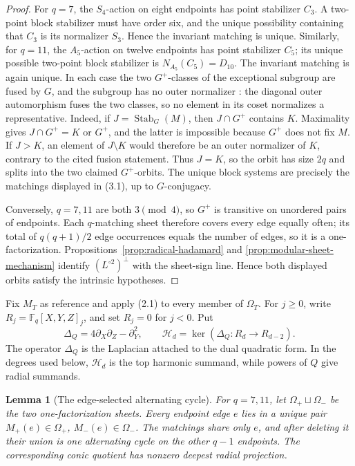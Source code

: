 \documentclass[11pt]{article}
\newtheorem{lemma}[theorem]{Lemma}
\theoremstyle{definition}
\theoremstyle{remark}
\newcommand{\F}{\mathbb{F}}
\begin{document}
\begin{proof}
For \(q=7\), the \(S_4\)-action on eight endpoints has point stabilizer
\(C_3\).  A two-point block stabilizer must have order six, and the
unique possibility containing that \(C_3\) is its normalizer \(S_3\).
Hence the invariant matching is unique.  Similarly, for \(q=11\), the
\(A_5\)-action on twelve endpoints has point stabilizer \(C_5\); its
unique possible two-point block stabilizer is
\(N_{A_5}(C_5)=D_{10}\).  The invariant matching is again unique.
In each case the two \(G^+\)-classes of the exceptional subgroup are
fused by \(G\), and the subgroup has no outer normalizer
\cite[Lemma~2.3]{Giudici2007}: the diagonal outer automorphism fuses the
two classes, so no element in its coset normalizes a representative.
Indeed, if \(J=\operatorname{Stab}_G(M)\), then
\(J\cap G^+\) contains \(K\).  Maximality gives
\(J\cap G^+=K\) or \(G^+\), and the latter is impossible because
\(G^+\) does not fix \(M\).  If \(J>K\), an element of \(J\setminus K\)
would therefore be an outer normalizer of \(K\), contrary to the cited
fusion statement.  Thus \(J=K\), so the orbit has size \(2q\) and
splits into the two claimed \(G^+\)-orbits.  The unique block systems
are precisely the matchings displayed in (3.1), up to
\(G\)-conjugacy.

Conversely, \(q=7,11\) are both \(3\pmod4\), so \(G^+\) is transitive on
unordered pairs of endpoints.  Each \(q\)-matching sheet therefore covers
every edge equally often; its total of \(q(q+1)/2\) edge occurrences
equals the number of edges, so it is a one-factorization.
Propositions~\ref{prop:radical-hadamard} and
\ref{prop:modular-sheet-mechanism} identify
\((L^{\circ2})^\perp\) with the sheet-sign line.  Hence both displayed
orbits satisfy the intrinsic hypotheses.
\end{proof}

Fix $M_T$ as reference and apply (2.1) to every member of $\Omega_T$.
For \(j\ge0\), write \(R_j=\F_q[X,Y,Z]_j\), and set \(R_j=0\) for
\(j<0\).  Put
\[
 \Delta_Q=4\partial_X\partial_Z-\partial_Y^2,\qquad
 \mathcal H_d=\ker(\Delta_Q:R_d\longrightarrow R_{d-2}).
                                                               \tag{3.3}
\]
The operator $\Delta_Q$ is the Laplacian attached to the dual quadratic
form.  In the degrees used below, $\mathcal H_d$ is the top harmonic
summand, while powers of $Q$ give radial summands.

\begin{lemma}[The edge-selected alternating cycle]
\label{lem:shared-radial-cycle}
For \(q=7,11\), let \(\Omega_+\sqcup\Omega_-\) be the two
one-factorization sheets.  Every endpoint edge \(e\) lies in a unique
pair \(M_+(e)\in\Omega_+\), \(M_-(e)\in\Omega_-\).  The matchings share
only \(e\), and after deleting it their union is one alternating cycle
on the other \(q-1\) endpoints.  The corresponding conic quotient has
nonzero deepest radial projection.
\end{lemma}
\end{document}
